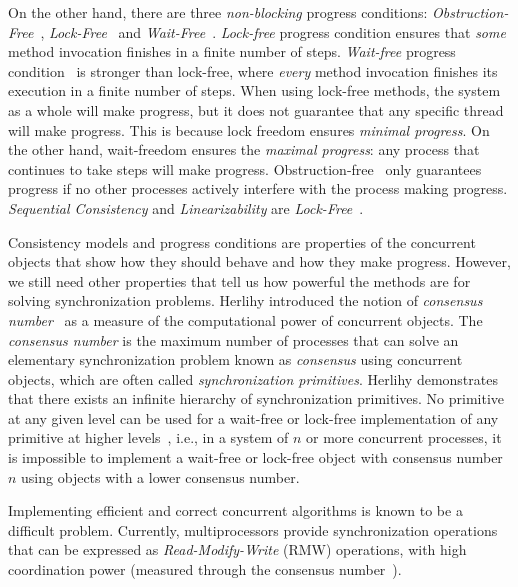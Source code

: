On the other hand, there are three \textit{non-blocking} progress conditions: \textit{Obstruction-Free}~\cite{DBLP_conf_icdcs_HerlihyLM03}, \textit{Lock-Free}~\cite{DBLP_journals_toplas_HerlihyW90DBLP_journals_toplas_HerlihyW90} and \textit{Wait-Free}~\cite{DBLP_journals_toplas_Herlihy91}. 
\textit{Lock-free} progress condition ensures that \textit{some} method invocation finishes in a finite number of steps. \textit{Wait-free} progress condition~\cite{DBLP_journals_toplas_Herlihy91} is stronger than lock-free, where \textit{every} method invocation finishes its execution in a finite number of steps. When using lock-free methods, the system as a whole will make progress, but it does not guarantee that any specific thread will make progress. This is because lock freedom ensures \textit{minimal progress}. On the other hand, wait-freedom ensures the \textit{maximal progress}: any process that continues to take steps will make progress. Obstruction-free~\cite{DBLP_conf_icdcs_HerlihyLM03} only guarantees progress if no other processes actively interfere with the process making progress. \textit{Sequential Consistency} and \textit{Linearizability} are \textit{Lock-Free}~\cite{DBLP_journals_toplas_HerlihyW90DBLP_journals_toplas_HerlihyW90}.

Consistency models and progress conditions are properties of the concurrent objects that show how they should behave and how they make progress. However, we still need other properties that tell us how powerful the methods are for solving synchronization problems. Herlihy introduced the notion of \textit{consensus number}~\cite{DBLP_journals_toplas_Herlihy91} as a measure of the computational power of concurrent objects. The \textit{consensus number} is the maximum number of processes that can solve an elementary synchronization problem known as \textit{consensus} using concurrent objects, which are often called \textit{synchronization primitives}. Herlihy demonstrates that there exists an infinite hierarchy of synchronization primitives. No primitive at any given level can be used for a wait-free or lock-free implementation of any primitive at higher levels~\cite{DBLP_journals_toplas_Herlihy91}, i.e., in a system of \(n\) or more concurrent processes, it is impossible to implement a wait-free or lock-free object with consensus number \(n\) using objects with a lower consensus number.

Implementing efficient and correct concurrent algorithms is known to be a difficult problem. 
Currently, multiprocessors provide synchronization operations that can be expressed as \textit{Read-Modify-Write} (RMW) operations, with high coordination power (measured through the consensus number~\cite{DBLP_journals_toplas_Herlihy91}).

